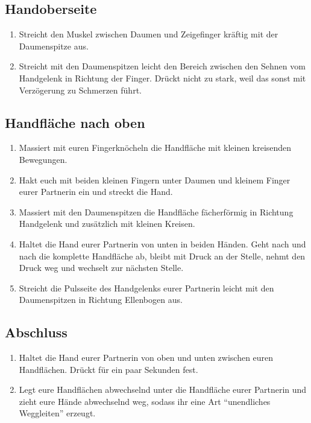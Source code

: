 \subsection{Handoberseite}
\begin{enumerate}
  \item {} Streicht den Muskel zwischen Daumen und Zeigefinger kräftig mit der Daumenspitze aus.
  \item {} Streicht mit den Daumenspitzen leicht den Bereich zwischen den Sehnen vom Handgelenk in Richtung der Finger. Drückt nicht zu stark, weil das sonst mit Verzögerung zu Schmerzen führt.
\end{enumerate}

\subsection{Handfläche nach oben}
\begin{enumerate}
  \item {} Massiert mit euren Fingerknöcheln die Handfläche mit kleinen kreisenden Bewegungen.
  \item {} Hakt euch mit beiden kleinen Fingern unter Daumen und kleinem Finger eurer Partnerin ein und streckt die Hand.
  \item {} Massiert mit den Daumenspitzen die Handfläche fächerförmig in Richtung Handgelenk und zusätzlich mit kleinen Kreisen.
  \item {} Haltet die Hand eurer Partnerin von unten in beiden Händen. Geht nach und nach die komplette Handfläche ab, bleibt mit Druck an der Stelle, nehmt den Druck weg und wechselt zur nächsten Stelle.
  \item {} Streicht die Pulsseite des Handgelenks eurer Partnerin leicht mit den Daumenspitzen in Richtung Ellenbogen aus.
\end{enumerate}

\subsection{Abschluss}
\begin{enumerate}
  \item {} Haltet die Hand eurer Partnerin von oben und unten zwischen euren Handflächen. Drückt für ein paar Sekunden fest.
  \item {} Legt eure Handflächen abwechselnd unter die Handfläche eurer Partnerin und zieht eure Hände abwechselnd weg, sodass ihr eine Art "`unendliches Weggleiten"' erzeugt.
\end{enumerate}
